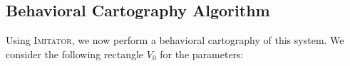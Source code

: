 \documentclass[a4paper,11pt]{article}
\newcommand{\imitator}{\textsc{Imitator}}
\begin{document}
% 
% 
% 
% 
% 
% 
% 
% 
% 
% 
% 
% 
% 
% 
% 
% 

\subsection{Behavioral Cartography Algorithm}


Using \imitator{}, we now perform a behavioral cartography of this system.
We consider the following rectangle $V_0$ for the parameters:
\end{document}
